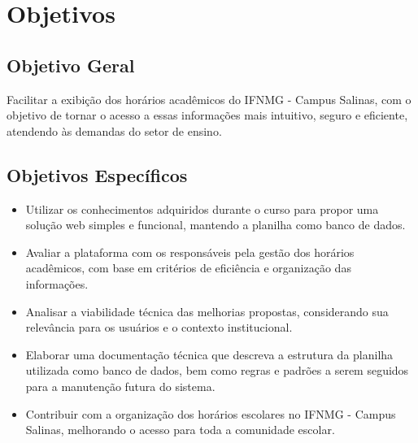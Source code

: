 \chapter{Objetivos} 
\label{cap2_objetivos} 

\section{Objetivo Geral}

Facilitar a exibição dos horários acadêmicos do IFNMG - Campus Salinas, com o objetivo de tornar o acesso a essas informações mais intuitivo, seguro e eficiente, atendendo às demandas do setor de ensino.

\section{Objetivos Específicos}

\begin{itemize}
    \item Utilizar os conhecimentos adquiridos durante o curso para propor uma solução web simples e funcional, mantendo a planilha como banco de dados.
    \item Avaliar a plataforma com os responsáveis pela gestão dos horários acadêmicos, com base em critérios de eficiência e organização das informações.
    \item Analisar a viabilidade técnica das melhorias propostas, considerando sua relevância para os usuários e o contexto institucional.
    \item Elaborar uma documentação técnica que descreva a estrutura da planilha utilizada como banco de dados, bem como regras e padrões a serem seguidos para a manutenção futura do sistema.
    \item Contribuir com a organização dos horários escolares no IFNMG - Campus Salinas, melhorando o acesso para toda a comunidade escolar.
\end{itemize}